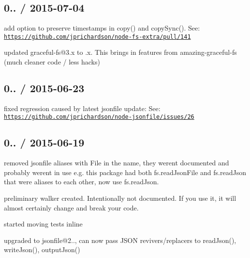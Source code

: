 \subsection*{0.. / 2015-\/07-\/04 }


\begin{DoxyItemize}
\item add option to preserve timestamps in {\ttfamily copy()} and {\ttfamily copy\+Sync()}. See\+: \href{https://github.com/jprichardson/node-fs-extra/pull/141}{\tt https\+://github.\+com/jprichardson/node-\/fs-\/extra/pull/141}
\item updated {\ttfamily graceful-\/fs@3.\+x} to {.\+x}. This brings in features from {\ttfamily amazing-\/graceful-\/fs} (much cleaner code / less hacks)
\end{DoxyItemize}

\subsection*{0.. / 2015-\/06-\/23 }


\begin{DoxyItemize}
\item fixed regression caused by latest jsonfile update\+: See\+: \href{https://github.com/jprichardson/node-jsonfile/issues/26}{\tt https\+://github.\+com/jprichardson/node-\/jsonfile/issues/26}
\end{DoxyItemize}

\subsection*{0.. / 2015-\/06-\/19 }


\begin{DoxyItemize}
\item removed {\ttfamily jsonfile} aliases with {\ttfamily File} in the name, they weren\textquotesingle{}t documented and probably weren\textquotesingle{}t in use e.\+g. this package had both {\ttfamily fs.\+read\+Json\+File} and {\ttfamily fs.\+read\+Json} that were aliases to each other, now use {\ttfamily fs.\+read\+Json}.
\item preliminary walker created. Intentionally not documented. If you use it, it will almost certainly change and break your code.
\item started moving tests inline
\item upgraded to {\ttfamily jsonfile@2..}, can now pass J\+S\+O\+N revivers/replacers to {\ttfamily read\+Json()}, {\ttfamily write\+Json()}, {\ttfamily output\+Json()}
\end{DoxyItemize}

